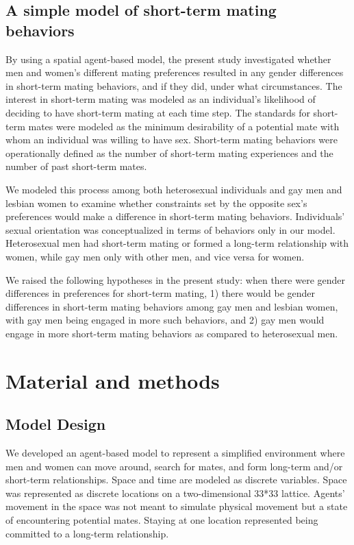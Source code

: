\documentclass[
  11pt,
]{article}
\begin{document}
\hypertarget{a-simple-model-of-short-term-mating-behaviors}{%
\subsection{A simple model of short-term mating
behaviors}\label{a-simple-model-of-short-term-mating-behaviors}}

By using a spatial agent-based model, the present study investigated
whether men and women's different mating preferences resulted in any
gender differences in short-term mating behaviors, and if they did,
under what circumstances. The interest in short-term mating was modeled
as an individual's likelihood of deciding to have short-term mating at
each time step. The standards for short-term mates were modeled as the
minimum desirability of a potential mate with whom an individual was
willing to have sex. Short-term mating behaviors were operationally
defined as the number of short-term mating experiences and the number of
past short-term mates.

We modeled this process among both heterosexual individuals and gay men
and lesbian women to examine whether constraints set by the opposite
sex's preferences would make a difference in short-term mating
behaviors. Individuals' sexual orientation was conceptualized in terms
of behaviors only in our model. Heterosexual men had short-term mating
or formed a long-term relationship with women, while gay men only with
other men, and vice versa for women.

We raised the following hypotheses in the present study: when there were
gender differences in preferences for short-term mating, 1) there would
be gender differences in short-term mating behaviors among gay men and
lesbian women, with gay men being engaged in more such behaviors, and 2)
gay men would engage in more short-term mating behaviors as compared to
heterosexual men.

\hypertarget{material-and-methods}{%
\section{Material and methods}\label{material-and-methods}}

\hypertarget{model-design}{%
\subsection{Model Design}\label{model-design}}

We developed an agent-based model to represent a simplified environment
where men and women can move around, search for mates, and form
long-term and/or short-term relationships. Space and time are modeled as
discrete variables. Space was represented as discrete locations on a
two-dimensional 33*33 lattice. Agents' movement in the space was not
meant to simulate physical movement but a state of encountering
potential mates. Staying at one location represented being committed to
a long-term relationship.
\end{document}
